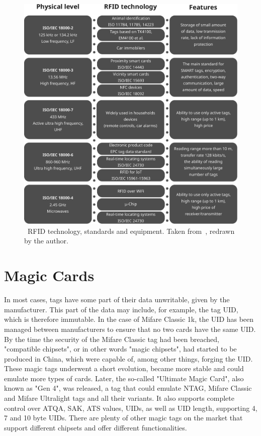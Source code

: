 \begin{figure}[ht]
  \centering
  \includegraphics[width=14cm]{text/rfid_graph.pdf} %
  \caption[RFID technology, standards and equipment.]{~RFID technology, standards and equipment. Taken from~\cite{masyuk2019information}, redrawn by the author.}
  \label{fig:rfid-graph}
\end{figure}


\section{Magic Cards}

In most cases, tags have some part of their data unwritable, given by the manufacturer. This part of the data may include, for example, the tag UID, which is therefore immutable. In the case of Mifare Classic 1k, the UID has been managed between manufacturers to ensure that no two cards have the same UID. By the time the security of the Mifare Classic tag had been breached, "compatible chipsets", or in other words "magic chipsets", had started to be produced in China, which were capable of, among other things, forging the UID. These magic tags underwent a short evolution, became more stable and could emulate more types of cards. Later, the so-called "Ultimate Magic Card", also known as "Gen 4", was released, a tag that could emulate NTAG, Mifare Classic and Mifare Ultralight tags and all their variants.  It also supports complete control over ATQA, SAK, ATS values, UIDs, as well as UID length, supporting 4, 7 and 10 byte UIDs. There are plenty of other magic tags on the market that support different chipsets and offer different functionalities.~\cite{magiccards}


